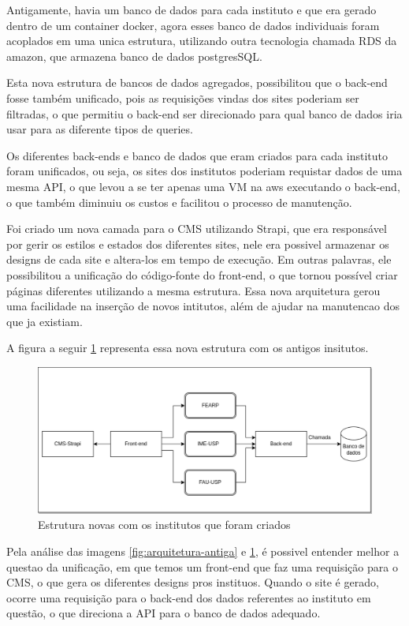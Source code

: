 \documentclass[12pt,twoside,english,brazilian]{article}
\begin{document}
Antigamente, havia um banco de dados para cada instituto e que era gerado dentro de um container docker, agora esses banco de dados individuais foram acoplados em uma unica estrutura, utilizando outra tecnologia chamada RDS da amazon, que armazena banco de dados postgresSQL.

Esta nova estrutura de bancos de dados agregados, possibilitou que o back-end fosse também unificado, pois as requisições vindas dos sites poderiam ser filtradas, o que permitiu o back-end ser direcionado para qual banco de dados iria usar para as diferente tipos de queries.

Os diferentes back-ends e banco de dados que eram criados para cada instituto foram unificados, ou seja, os sites dos institutos poderiam requistar dados de uma mesma API, o que levou a se ter apenas uma VM na aws executando o back-end, o que também diminuiu os custos e facilitou o processo de manutenção.

Foi criado um nova camada para o CMS utilizando Strapi, que era responsável por gerir os estilos e estados dos diferentes sites, nele era possivel armazenar os designs de cada site e altera-los em tempo de execução. Em outras palavras, ele possibilitou a unificação do código-fonte do front-end, o que tornou possível criar páginas diferentes utilizando a mesma estrutura. Essa nova arquitetura gerou uma facilidade na inserção de novos intitutos, além de ajudar na manutencao dos que ja existiam.

A figura a seguir \ref{fig:arquitetura-nova} representa essa nova estrutura com os antigos insitutos. 

\begin{figure}
    \centering
    \includegraphics[width=1\linewidth]{figuras/nova_arquitetura.drawio-_1_.pdf}
    \caption{Estrutura novas com os institutos que foram criados}
    \label{fig:arquitetura-nova}
\end{figure}

Pela análise das imagens \ref{fig:arquitetura-antiga} e \ref{fig:arquitetura-nova}, é possivel entender melhor a questao da unificação, em que temos um front-end que faz uma requisição para o CMS, o que gera os diferentes designs pros instituos. Quando o site é gerado, ocorre uma requisição para o back-end dos dados referentes ao instituto em questão, o que direciona a API para o banco de dados adequado.
\end{document}
